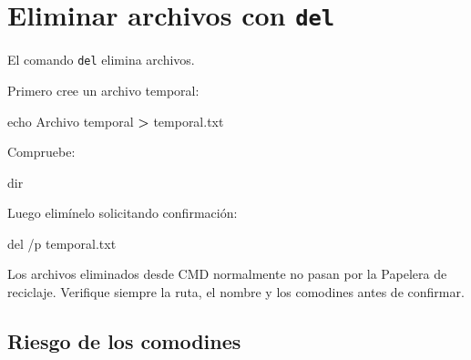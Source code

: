 \documentclass[
  spanish,
  letterpaper,
]{scrbook}
\newenvironment{Shaded}{\begin{snugshade}}{\end{snugshade}}
\newcommand{\AttributeTok}[1]{\textcolor[rgb]{0.40,0.45,0.13}{#1}}
\newcommand{\BuiltInTok}[1]{\textcolor[rgb]{0.00,0.23,0.31}{#1}}
\newcommand{\KeywordTok}[1]{\textcolor[rgb]{0.00,0.23,0.31}{\textbf{#1}}}
\newcommand{\NormalTok}[1]{\textcolor[rgb]{0.00,0.23,0.31}{#1}}
\begin{document}

\chapter{\texorpdfstring{Eliminar archivos con
\texttt{del}}{Eliminar archivos con del}}\label{eliminar-archivos-con-del}

El comando \texttt{del} elimina archivos.

Primero cree un archivo temporal:

\begin{Shaded}
\begin{Highlighting}[]
\BuiltInTok{echo}\NormalTok{ Archivo temporal }\KeywordTok{\textgreater{}}\NormalTok{ temporal.txt}
\end{Highlighting}
\end{Shaded}

Compruebe:

\begin{Shaded}
\begin{Highlighting}[]
\BuiltInTok{dir}
\end{Highlighting}
\end{Shaded}

Luego elimínelo solicitando confirmación:

\begin{Shaded}
\begin{Highlighting}[]
\BuiltInTok{del} \AttributeTok{/p}\NormalTok{ temporal.txt}
\end{Highlighting}
\end{Shaded}

\begin{tcolorbox}[enhanced jigsaw, arc=.35mm, bottomrule=.15mm, bottomtitle=1mm, breakable, colback=white, colbacktitle=quarto-callout-warning-color!10!white, colframe=quarto-callout-warning-color-frame, coltitle=black, left=2mm, leftrule=.75mm, opacityback=0, opacitybacktitle=0.6, rightrule=.15mm, title=\textcolor{quarto-callout-warning-color}{\faExclamationTriangle}\hspace{0.5em}{Advertencia}, titlerule=0mm, toprule=.15mm, toptitle=1mm]

Los archivos eliminados desde CMD normalmente no pasan por la Papelera
de reciclaje. Verifique siempre la ruta, el nombre y los comodines antes
de confirmar.

\end{tcolorbox}

\section{Riesgo de los comodines}\label{riesgo-de-los-comodines}
\end{document}

